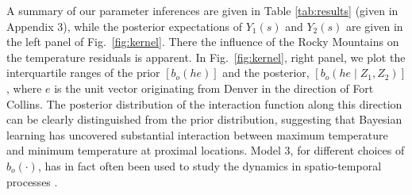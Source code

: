 \documentclass[lineno]{biometrika}
\newcommand{\Bmat} {B}
\newcommand{\svec} {s}
\newcommand{\h}{h}
\newcommand{\e}{e}
\newcommand{\Zvec}{Z}
\begin{document}

 A summary of our parameter inferences are given in Table \ref{tab:results} (given in Appendix 3), while the posterior expectations of $Y_1(\svec)$ and $Y_2(\svec)$  are given in the left panel of Fig.~\ref{fig:kernel}. There the influence of the Rocky Mountains on the temperature residuals is apparent. In Fig.~\ref{fig:kernel}, right panel, we plot the interquartile ranges of the prior $[b_o(h\e)]$ and the posterior, $[b_o(h\e\mid \Zvec_1,\Zvec_2)]$, where $\e$ is the unit vector originating from Denver in the direction of Fort Collins. The posterior distribution of the interaction function along this direction can be clearly distinguished from the prior distribution, suggesting that Bayesian learning has uncovered substantial interaction between maximum temperature and minimum temperature at proximal locations. Model 3, for different choices of $b_o(\cdot)$, has in fact often been used to study the dynamics in spatio-temporal processes \citep{Kot_1986,Wikle_2002}.



\end{document}
